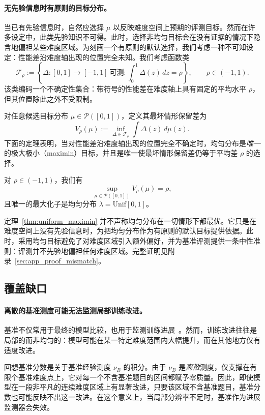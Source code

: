 \paragraph{无先验信息时有原则的目标分布。}
当已有先验信息时，自然应选择 $\mu$ 以反映难度空间上预期的评测目标。然而在许多设定中，此类先验知识不可得。此时，选择非均匀目标会在没有证据的情况下隐含地偏袒某些难度区域。为刻画一个有原则的默认选择，我们考虑一种不可知设定：性能差沿难度轴出现的位置完全未知。我们考虑函数类
\[
\mathcal{F}_{\rho}
:=
\left\{
\Delta:[0,1]\to[-1,1]\ \text{可测} :
\int_0^1 \Delta(z)\,dz = \rho
\right\},
\qquad \rho\in(-1,1).
\]
该类编码一个不确定性集合：带符号的性能差在难度轴上具有固定的平均水平 $\rho$，但其位置除此之外不受限制。

对任意候选目标分布 $\mu \in \mathcal P([0,1])$，定义其最坏情形保留差为
\[
V_{\rho}(\mu)
:=
\inf_{\Delta \in \mathcal{F}_{\rho}}
\int \Delta(z)\, d\mu(z).
\]
下面的定理表明，当对性能差沿难度轴出现的位置完全不确定时，均匀分布是\textit{唯一}的极大极小（maximin）目标，并且是唯一使最坏情形保留差仍等于平均差 $\rho$ 的选择。

\begin{theorem}[均匀目标是唯一的极大极小选择]
\label{thm:uniform_maximin}
对 $\rho \in (-1,1)$，我们有
\[
\sup_{\mu \in \mathcal P([0,1])} V_{\rho}(\mu) = \rho,
\]
且唯一的最大化子是均匀分布 $\lambda=\mathrm{Unif}[0,1]$。
\end{theorem}
定理~\ref{thm:uniform_maximin} 并不声称均匀分布在一切情形下都最优。它只是在难度空间上没有先验信息时，为把均匀分布作为有原则的默认目标提供依据。此时，采用均匀目标避免了对难度区域引入额外偏好，并为基准评测提供一条中性准则：评测并不先验地偏袒任何难度区域。完整证明见附录~\ref{sec:app_proof_mismatch}。


\subsection{覆盖缺口}

\paragraph{离散的基准测度可能无法监测局部训练改进。}
基准不仅常用于最终的模型比较，也用于监测训练进展~\citep{he2025skywork,yu2025dapo,luo2025deepscaler}。然而，训练改进往往是局部的而非均匀的：模型可能在某一特定难度范围内大幅提升，而在其他地方仅有适度改进。

回想基准分数是关于基准经验测度 $\nu_B$ 的积分。由于 $\nu_B$ 是\textit{离散}测度，仅支撑在有限个基准难度点上，它对每一个不含基准题目的区间都赋予零质量。因此，即使模型在一段非平凡的连续难度区域上有显著改进，只要该区域不含基准题目，基准分数也可能反映不出这一改进。在这个意义上，当局部分辨率不足时，基准作为进展监测器会失效。

